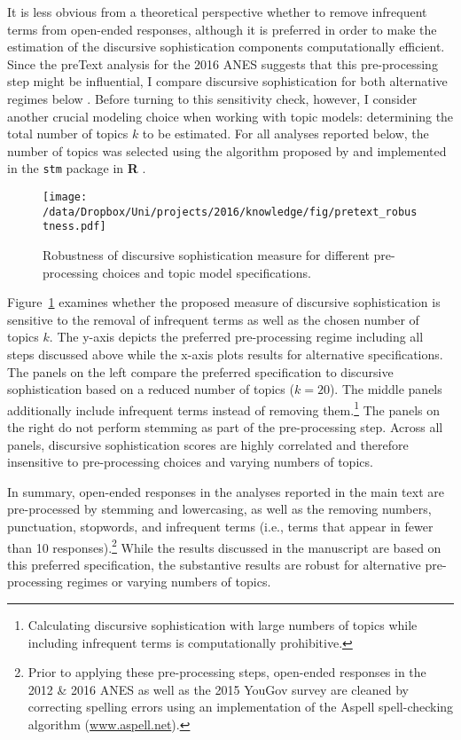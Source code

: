 It is less obvious from a theoretical perspective whether to remove infrequent terms from open-ended responses, although it is preferred in order to make the estimation of the discursive sophistication components computationally efficient. Since the preText analysis for the 2016 ANES suggests that this pre-processing step might be influential, I compare discursive sophistication for both alternative regimes below \citep[c.f.,][]{denny2018text}. Before turning to this sensitivity check, however, I consider another crucial modeling choice when working with topic models: determining the total number of topics $k$ to be estimated. For all analyses reported below, the number of topics was selected using the algorithm proposed by \citet{lee2014low} and implemented in the \texttt{stm} package in \textbf{R} \citep{roberts2014stm}.

\begin{figure}[h]\centering
\texttt{[image: /data/Dropbox/Uni/projects/2016/knowledge/fig/pretext\_robustness.pdf]}
\caption[Robustness of discursive sophistication measure for different pre-processing choices and topic model specifications]{Robustness of discursive sophistication measure for different pre-processing choices and topic model specifications.}\label{fig:pretext_robustness}
\end{figure}

Figure~\ref{fig:pretext_robustness} examines whether the proposed measure of discursive sophistication is sensitive to the removal of infrequent terms as well as the chosen number of topics $k$. The y-axis depicts the preferred pre-processing regime including all steps discussed above while the x-axis plots results for alternative specifications. The panels on the left compare the preferred specification to discursive sophistication based on a reduced number of topics ($k=20$). The middle panels additionally include infrequent terms instead of removing them.\footnote{Calculating discursive sophistication with large numbers of topics while including infrequent terms is computationally prohibitive.} The panels on the right do not perform stemming as part of the pre-processing step. Across all panels, discursive sophistication scores are highly correlated and therefore insensitive to pre-processing choices and varying numbers of topics.

In summary, open-ended responses in the analyses reported in the main text are pre-processed by stemming and lowercasing, as well as the removing numbers, punctuation, stopwords, and infrequent terms (i.e., terms that appear in fewer than 10 responses).\footnote{Prior to applying these pre-processing steps, open-ended responses in the 2012 \& 2016 ANES as well as the 2015 YouGov survey are cleaned by correcting spelling errors using an implementation of the Aspell spell-checking algorithm (\url{www.aspell.net}).} While the results discussed in the manuscript are based on this preferred specification, the substantive results are robust for alternative pre-processing regimes or varying numbers of topics.


